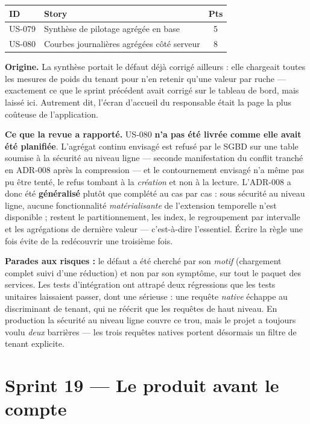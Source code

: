 \begin{center}
\begin{tabular}{lp{9cm}c}
\toprule
\textbf{ID} & \textbf{Story} & \textbf{Pts} \\
\midrule
US-079 & Synthèse de pilotage agrégée en base       & 5 \\
US-080 & Courbes journalières agrégées côté serveur & 8 \\
\bottomrule
\end{tabular}
\end{center}

\textbf{Origine.} La synthèse portait le défaut déjà corrigé ailleurs : elle
chargeait toutes les mesures de poids du tenant pour n'en retenir qu'une valeur
par ruche --- exactement ce que le sprint précédent avait corrigé sur le tableau
de bord, mais laissé ici. Autrement dit, l'écran d'accueil du responsable était la
page la plus coûteuse de l'application.

\textbf{Ce que la revue a rapporté.} US-080 \textbf{n'a pas été livrée comme elle
avait été planifiée}. L'agrégat continu envisagé est refusé par le SGBD sur une
table soumise à la sécurité au niveau ligne --- seconde manifestation du conflit
tranché en ADR-008 après la compression --- et le contournement envisagé n'a même
pas pu être tenté, le refus tombant à la \emph{création} et non à la lecture.
L'ADR-008 a donc été \textbf{généralisé} plutôt que complété au cas par cas :
sous sécurité au niveau ligne, aucune fonctionnalité \emph{matérialisante} de
l'extension temporelle n'est disponible ; restent le partitionnement, les index,
le regroupement par intervalle et les agrégations de dernière valeur ---
c'est-à-dire l'essentiel. Écrire la règle une fois évite de la redécouvrir une
troisième fois.

\textbf{Parades aux risques :} le défaut a été cherché par son \emph{motif}
(chargement complet suivi d'une réduction) et non par son symptôme, sur tout le
paquet des services. Les tests d'intégration ont attrapé deux régressions que les
tests unitaires laissaient passer, dont une sérieuse : une requête \emph{native}
échappe au discriminant de tenant, qui ne réécrit que les requêtes de haut niveau.
En production la sécurité au niveau ligne couvre ce trou, mais le projet a
toujours voulu \emph{deux} barrières --- les trois requêtes natives portent
désormais un filtre de tenant explicite.

\section{Sprint 19 --- Le produit avant le compte}

